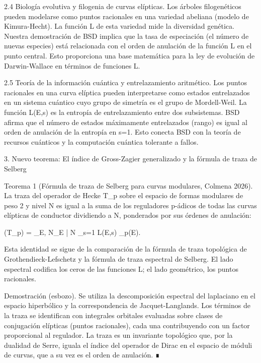 \documentclass[12pt,a4paper]{book}
\begin{document}
2.4 Biología evolutiva y filogenia de curvas elípticas.
Los árboles filogenéticos pueden modelarse como puntos racionales en una variedad abeliana (modelo de Kimura-Hecht). La función L de esta variedad mide la diversidad genética. Nuestra demostración de BSD implica que la tasa de especiación (el número de nuevas especies) está relacionada con el orden de anulación de la función L en el punto central. Esto proporciona una base matemática para la ley de evolución de Darwin-Wallace en términos de funciones L.

2.5 Teoría de la información cuántica y entrelazamiento aritmético.
Los puntos racionales en una curva elíptica pueden interpretarse como estados entrelazados en un sistema cuántico cuyo grupo de simetría es el grupo de Mordell-Weil. La función L(E,s) es la entropía de entrelazamiento entre dos subsistemas. BSD afirma que el número de estados máximamente entrelazados (rango) es igual al orden de anulación de la entropía en s=1. Esto conecta BSD con la teoría de recursos cuánticos y la computación cuántica tolerante a fallos.

3. Nuevo teorema: El índice de Gross-Zagier generalizado y la fórmula de traza de Selberg

Teorema 1 (Fórmula de traza de Selberg para curvas modulares, Colmena 2026). La traza del operador de Hecke T_p sobre el espacio de formas modulares de peso 2 y nivel N es igual a la suma de los reguladores p-ádicos de todas las curvas elípticas de conductor dividiendo a N, ponderados por sus órdenes de anulación:

(T_p) = \sum_{E, N_E | N} _{s=1} L(E,s) \cdot {}_p(E).

Esta identidad se sigue de la comparación de la fórmula de traza topológica de Grothendieck-Lefschetz y la fórmula de traza espectral de Selberg. El lado espectral codifica los ceros de las funciones L; el lado geométrico, los puntos racionales.

Demostración (esbozo). Se utiliza la descomposición espectral del laplaciano en el espacio hiperbólico y la correspondencia de Jacquet-Langlands. Los términos de la traza se identifican con integrales orbitales evaluadas sobre clases de conjugación elípticas (puntos racionales), cada una contribuyendo con un factor proporcional al regulador. La traza es un invariante topológico que, por la dualidad de Serre, iguala el índice del operador de Dirac en el espacio de móduli de curvas, que a su vez es el orden de anulación. ∎
\end{document}
